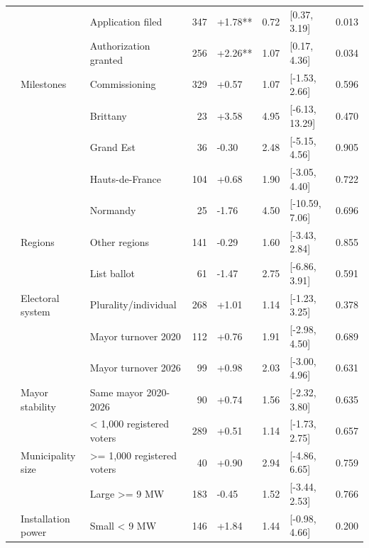 \begin{ThreePartTable}
\begin{longtable}[t]{lllrllll}
\cmidrule{2-8}\nopagebreak
 &  & Application filed & 347 & +1.78** & 0.72 & {}[0.37, 3.19] & 0.013\\
\cmidrule{3-8}\nopagebreak
 &  & Authorization granted & 256 & +2.26** & 1.07 & {}[0.17, 4.36] & 0.034\\
\cmidrule{3-8}\nopagebreak
 & \multirow[t]{-3}{*}{\raggedright\arraybackslash Milestones} & Commissioning & 329 & +0.57 & 1.07 & {}[-1.53, 2.66] & 0.596\\
\cmidrule{2-8}\nopagebreak
 &  & Brittany & 23 & +3.58 & 4.95 & {}[-6.13, 13.29] & 0.470\\
\cmidrule{3-8}\nopagebreak
 &  & Grand Est & 36 & -0.30 & 2.48 & {}[-5.15, 4.56] & 0.905\\
\cmidrule{3-8}\nopagebreak
 &  & Hauts-de-France & 104 & +0.68 & 1.90 & {}[-3.05, 4.40] & 0.722\\
\cmidrule{3-8}\nopagebreak
 &  & Normandy & 25 & -1.76 & 4.50 & {}[-10.59, 7.06] & 0.696\\
\cmidrule{3-8}\nopagebreak
 & \multirow[t]{-5}{*}{\raggedright\arraybackslash Regions} & Other regions & 141 & -0.29 & 1.60 & {}[-3.43, 2.84] & 0.855\\
\cmidrule{2-8}\nopagebreak
 &  & List ballot & 61 & -1.47 & 2.75 & {}[-6.86, 3.91] & 0.591\\
\cmidrule{3-8}\nopagebreak
 & \multirow[t]{-2}{*}{\raggedright\arraybackslash Electoral system} & Plurality/individual & 268 & +1.01 & 1.14 & {}[-1.23, 3.25] & 0.378\\
\cmidrule{2-8}\nopagebreak
 &  & Mayor turnover 2020 & 112 & +0.76 & 1.91 & {}[-2.98, 4.50] & 0.689\\
\cmidrule{3-8}\nopagebreak
 &  & Mayor turnover 2026 & 99 & +0.98 & 2.03 & {}[-3.00, 4.96] & 0.631\\
\cmidrule{3-8}\nopagebreak
 & \multirow[t]{-3}{*}{\raggedright\arraybackslash Mayor stability} & Same mayor 2020-2026 & 90 & +0.74 & 1.56 & {}[-2.32, 3.80] & 0.635\\
\cmidrule{2-8}\nopagebreak
 &  & < 1,000 registered voters & 289 & +0.51 & 1.14 & {}[-1.73, 2.75] & 0.657\\
\cmidrule{3-8}\nopagebreak
 & \multirow[t]{-2}{*}{\raggedright\arraybackslash Municipality size} & >= 1,000 registered voters & 40 & +0.90 & 2.94 & {}[-4.86, 6.65] & 0.759\\
\cmidrule{2-8}\nopagebreak
 &  & Large >= 9 MW & 183 & -0.45 & 1.52 & {}[-3.44, 2.53] & 0.766\\
\cmidrule{3-8}\nopagebreak
 & \multirow[t]{-2}{*}{\raggedright\arraybackslash Installation power} & Small < 9 MW & 146 & +1.84 & 1.44 & {}[-0.98, 4.66] & 0.200\\

\end{longtable}
\end{ThreePartTable}
